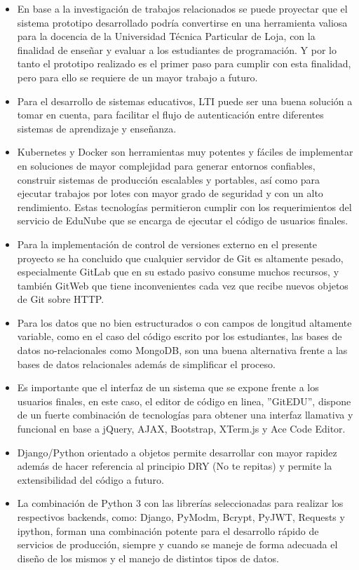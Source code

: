 \begin{itemize}
  \item En base a la investigación de trabajos relacionados se puede proyectar que el sistema prototipo desarrollado podría convertirse en una herramienta valiosa para la docencia de la Universidad Técnica Particular de Loja, con la finalidad de enseñar y evaluar a los estudiantes de programación. Y por lo tanto el prototipo realizado es el primer paso para cumplir con esta finalidad, pero para ello se requiere de un mayor trabajo a futuro.
  \item Para el desarrollo de sistemas educativos, LTI puede ser una buena solución a tomar en cuenta, para facilitar el flujo de autenticación entre diferentes sistemas de aprendizaje y enseñanza.
  \item Kubernetes y Docker son herramientas muy potentes y fáciles de implementar en soluciones de mayor complejidad para generar entornos confiables, construir sistemas de producción escalables y portables, así como para ejecutar trabajos por lotes con mayor grado de seguridad y con un alto rendimiento. Estas tecnologías permitieron cumplir con los requerimientos del servicio de EduNube que se encarga de ejecutar el código de usuarios finales.
  \item Para la implementación de control de versiones externo en el presente proyecto se ha concluido que cualquier servidor de Git es altamente pesado, especialmente GitLab que en su estado pasivo consume muchos recursos, y también GitWeb que tiene inconvenientes cada vez que recibe nuevos objetos de Git sobre HTTP.
  \item Para los datos que no bien estructurados o con campos de longitud altamente variable, como en el caso del código escrito por los estudiantes, las bases de datos no-relacionales como MongoDB, son una buena alternativa frente a las bases de datos relacionales además de simplificar el proceso. 
  \item Es importante que el interfaz de un sistema que se expone frente a los usuarios finales, en este caso, el editor de código en linea, ''GitEDU'', dispone de un fuerte combinación de tecnologías para obtener una interfaz llamativa y funcional en base a jQuery, AJAX, Bootstrap, XTerm.js y Ace Code Editor.
  \item Django/Python orientado a objetos permite desarrollar con mayor rapidez además de hacer referencia al principio DRY (No te repitas) y permite la extensibilidad del código a futuro. 
  \item La combinación de Python 3 con las librerías seleccionadas para realizar los respectivos backends, como: Django, PyModm, Bcrypt, PyJWT, Requests y ipython, forman una combinación potente para el desarrollo rápido de servicios de producción, siempre y cuando se maneje de forma adecuada el diseño de los mismos y el manejo de distintos tipos de datos.
\end{itemize}

